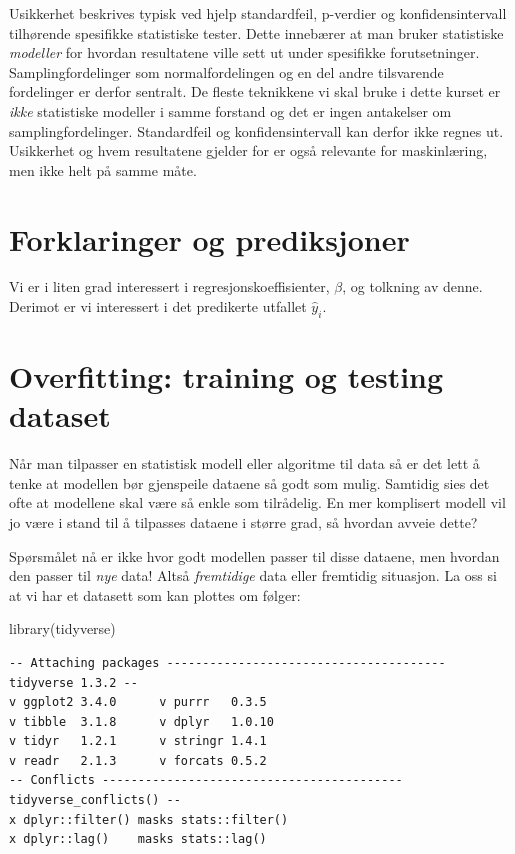 \documentclass[
  letterpaper,
  DIV=11,
  numbers=noendperiod]{scrreprt}
\newenvironment{Shaded}{\begin{snugshade}}{\end{snugshade}}
\newcommand{\FunctionTok}[1]{\textcolor[rgb]{0.28,0.35,0.67}{#1}}
\newcommand{\NormalTok}[1]{\textcolor[rgb]{0.00,0.23,0.31}{#1}}
\theoremstyle{definition}
\theoremstyle{remark}
\begin{document}
Usikkerhet beskrives typisk ved hjelp standardfeil, p-verdier og
konfidensintervall tilhørende spesifikke statistiske tester. Dette
innebærer at man bruker statistiske \emph{modeller} for hvordan
resultatene ville sett ut under spesifikke forutsetninger.
Samplingfordelinger som normalfordelingen og en del andre tilsvarende
fordelinger er derfor sentralt. De fleste teknikkene vi skal bruke i
dette kurset er \emph{ikke} statistiske modeller i samme forstand og det
er ingen antakelser om samplingfordelinger. Standardfeil og
konfidensintervall kan derfor ikke regnes ut. Usikkerhet og hvem
resultatene gjelder for er også relevante for maskinlæring, men ikke
helt på samme måte.

\hypertarget{forklaringer-og-prediksjoner}{%
\section{Forklaringer og
prediksjoner}\label{forklaringer-og-prediksjoner}}

Vi er i liten grad interessert i regresjonskoeffisienter, \(\beta\), og
tolkning av denne. Derimot er vi interessert i det predikerte utfallet
\(\hat{y}_i\).

\hypertarget{overfitting-training-og-testing-dataset}{%
\section{Overfitting: training og testing
dataset}\label{overfitting-training-og-testing-dataset}}

Når man tilpasser en statistisk modell eller algoritme til data så er
det lett å tenke at modellen bør gjenspeile dataene så godt som mulig.
Samtidig sies det ofte at modellene skal være så enkle som tilrådelig.
En mer komplisert modell vil jo være i stand til å tilpasses dataene i
større grad, så hvordan avveie dette?

Spørsmålet nå er ikke hvor godt modellen passer til disse dataene, men
hvordan den passer til \emph{nye} data! Altså \emph{fremtidige} data
eller fremtidig situasjon. La oss si at vi har et datasett som kan
plottes om følger:

\begin{Shaded}
\begin{Highlighting}[]
\FunctionTok{library}\NormalTok{(tidyverse)}
\end{Highlighting}
\end{Shaded}

\begin{verbatim}
-- Attaching packages --------------------------------------- tidyverse 1.3.2 --
v ggplot2 3.4.0      v purrr   0.3.5 
v tibble  3.1.8      v dplyr   1.0.10
v tidyr   1.2.1      v stringr 1.4.1 
v readr   2.1.3      v forcats 0.5.2 
-- Conflicts ------------------------------------------ tidyverse_conflicts() --
x dplyr::filter() masks stats::filter()
x dplyr::lag()    masks stats::lag()
\end{verbatim}
\end{document}
